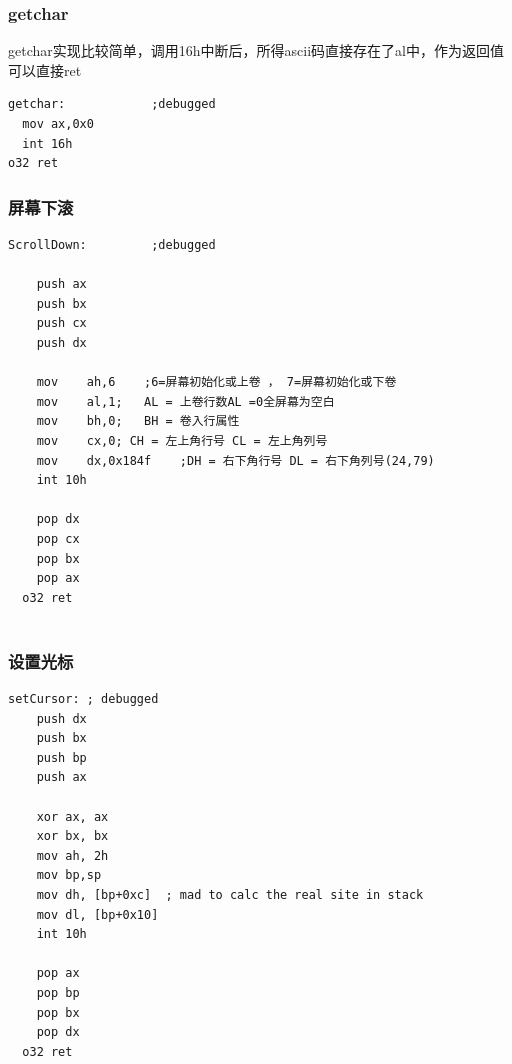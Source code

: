 \documentclass[a4paper,11pt,UTF8]{ctexart}
\begin{document}
        \subsubsection{getchar}
        getchar实现比较简单，调用16h中断后，所得ascii码直接存在了al中，作为返回值可以直接ret
        \begin{lstlisting}[caption={asm code },tabsize=4,basicstyle=\footnotesize,captionpos=b]
getchar:			;debugged
  mov ax,0x0
  int 16h
o32 ret
        \end{lstlisting}
        
        \subsubsection{屏幕下滚}
  \begin{lstlisting}[caption={asm code },tabsize=4,basicstyle=\footnotesize,captionpos=b]
ScrollDown:			;debugged

    push ax
    push bx
    push cx
    push dx
  
    mov    ah,6    ;6=屏幕初始化或上卷 ， 7=屏幕初始化或下卷
    mov    al,1;   AL = 上卷行数AL =0全屏幕为空白 
    mov    bh,0;   BH = 卷入行属性
    mov    cx,0; CH = 左上角行号 CL = 左上角列号 
    mov    dx,0x184f    ;DH = 右下角行号 DL = 右下角列号(24,79)
    int 10h
  
    pop dx
    pop cx
    pop bx
    pop ax
  o32 ret
      
  \end{lstlisting}
  
        \subsubsection{设置光标}
  \begin{lstlisting}[caption={asm code },tabsize=4,basicstyle=\footnotesize,captionpos=b]
  setCursor: ; debugged
    push dx
    push bx
    push bp
    push ax
  
    xor ax, ax
    xor bx, bx
    mov ah, 2h
    mov bp,sp
    mov dh, [bp+0xc]  ; mad to calc the real site in stack
    mov dl, [bp+0x10]
    int 10h
  
    pop ax
    pop bp
    pop bx
    pop dx
  o32 ret
  \end{lstlisting}
  
\end{document}
